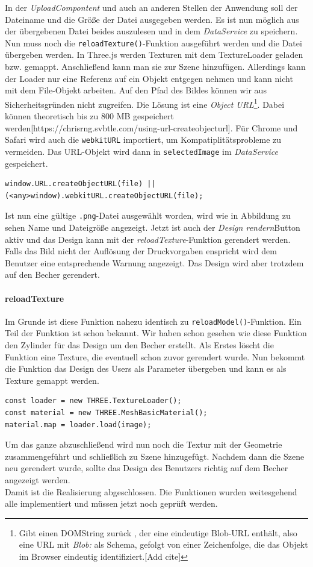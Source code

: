 In der \textit{UploadCompontent} und auch an anderen Stellen der Anwendung soll der Dateiname und die Größe der Datei ausgegeben werden. Es ist nun möglich aus der übergebenen Datei beides auszulesen und in dem \textit{DataService} zu speichern. Nun muss noch die \texttt{reloadTexture()}-Funktion ausgeführt werden und die Datei übergeben werden. In Three.js werden Texturen mit dem TextureLoader geladen bzw. gemappt. Anschließend kann man sie zur Szene hinzufügen. Allerdings kann der Loader nur eine Referenz auf ein Objekt entgegen nehmen und kann nicht mit dem File-Objekt arbeiten. Auf den Pfad des Bildes können wir aus Sicherheitsgründen nicht zugreifen. Die Lösung ist eine \textit{Object URL}\footnote{Gibt einen DOMString zurück , der eine eindeutige Blob-URL enthält, also eine URL mit \textit{Blob:} als Schema, gefolgt von einer Zeichenfolge, die das Objekt im Browser eindeutig identifiziert.[Add cite]}. Dabei können theoretisch bis zu 800 MB gespeichert werden[https://chrisrng.svbtle.com/using-url-createobjecturl]. Für Chrome und Safari wird auch die \texttt{webkitURL} importiert, um Kompatiplitätsprobleme zu vermeiden. Das URL-Objekt wird dann in \texttt{selectedImage} im \textit{DataService} gespeichert.
%
\begin{lstlisting}[caption={CreateObjectURL() Methode},label=lst:bloburl]
window.URL.createObjectURL(file) || (<any>window).webkitURL.createObjectURL(file);
\end{lstlisting}
%
Ist nun eine gültige \texttt{.png}-Datei ausgewählt worden, wird wie in Abbildung zu sehen Name und Dateigröße angezeigt. Jetzt ist auch der \textit{Design rendern}Button aktiv und das Design kann mit der \textit{reloadTexture}-Funktion gerendert werden. Falls das Bild nicht der Auflösung der Druckvorgaben enspricht wird dem Benutzer eine entsprechende Warnung angezeigt. Das Design wird aber trotzdem auf den Becher gerendert.

\paragraph{reloadTexture}
Im Grunde ist diese Funktion nahezu identisch zu \texttt{reloadModel()}-Funktion. Ein Teil der Funktion ist schon bekannt. Wir haben schon gesehen wie diese Funktion den Zylinder für das Design um den Becher erstellt. Als Erstes löscht die Funktion eine Texture, die eventuell schon zuvor gerendert wurde. Nun bekommt die Funktion das Design des Users als Parameter übergeben und kann es als Texture gemappt werden.
%
\begin{lstlisting}[caption={TextureLoader Umsetzung},label=lst:texture]
const loader = new THREE.TextureLoader();
const material = new THREE.MeshBasicMaterial();
material.map = loader.load(image);
\end{lstlisting}
%
Um das ganze abzuschließend wird nun noch die Textur mit der Geometrie zusammengeführt und schließlich zu Szene hinzugefügt. Nachdem dann die Szene neu gerendert wurde, sollte das Design des Benutzers richtig auf dem Becher angezeigt werden.\\

Damit ist die Realisierung abgeschlossen. Die Funktionen wurden weitesgehend alle implementiert und müssen jetzt noch geprüft werden.